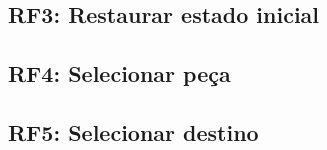   \subsection{RF3: Restaurar estado inicial} \lipsum[1] %
  \subsection{RF4: Selecionar peça}\label{subsection:RF4}\lipsum[1] %
  \subsection{RF5: Selecionar destino} \lipsum[1] %
